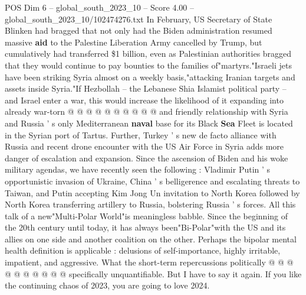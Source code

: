 \begin{textsample}{POS Dim 6 – global\_south\_2023\_10 – Score 4.00 – global\_south\_2023\_10/102474276.txt}
In February, US Secretary of State Blinken had bragged that not only had the Biden administration resumed massive \textbf{aid} to the Palestine Liberation Army cancelled by Trump, but cumulatively had transferred \$1 billion, even as Palestinian authorities bragged that they would continue to pay bounties to the families of"martyrs."Israeli jets have been striking Syria almost on a weekly basis,"attacking Iranian targets and assets inside Syria."If Hezbollah -- the Lebanese Shia Islamist political party -- and Israel enter a war, this would increase the likelihood of it expanding into already war-torn @ @ @ @ @ @ @ @ @ @ and friendly relationship with Syria and Russia ' s only Mediterranean \textbf{naval} base for its Black \textbf{Sea} Fleet is located in the Syrian port of Tartus.
Further, Turkey ' s new de facto alliance with Russia and recent drone encounter with the US Air Force in Syria adds more danger of escalation and expansion.
Since the ascension of Biden and his woke military agendas, we have recently seen the following : Vladimir Putin ' s opportunistic invasion of Ukraine, China ' s belligerence and escalating threats to Taiwan, and Putin accepting Kim Jong Un invitation to North Korea followed by North Korea transferring artillery to Russia, bolstering Russia ' s forces.
All this talk of a new"Multi-Polar World"is meaningless babble.
Since the beginning of the 20th century until today, it has always been"Bi-Polar"with the US and its allies on one side and another coalition on the other.
Perhaps the bipolar mental health definition is applicable : delusions of self-importance, highly irritable, impatient, and aggressive.
What the short-term repercussions politically @ @ @ @ @ @ @ @ @ @ specifically unquantifiable.
But I have to say it again.
If you like the continuing chaos of 2023, you are going to love 2024.

\end{textsample}
